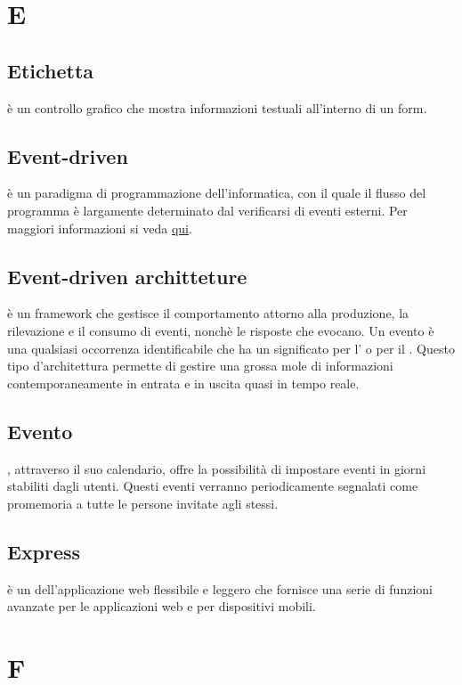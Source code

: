 \documentclass[12pt,a4paper]{article}
\begin{document}
\newpage

\section{E}


\subsection{Etichetta} 
 è un controllo grafico che mostra informazioni testuali all'interno di un form.

\subsection{Event-driven} 
 è un paradigma di programmazione dell'informatica, con il quale il flusso del programma è largamente determinato dal verificarsi di eventi esterni. Per maggiori informazioni si veda \href{https://it.wikipedia.org/wiki/Programmazione_a_eventi}{qui}.

\subsection{Event-driven architteture} 
è un framework che gestisce il comportamento attorno alla produzione, la rilevazione e il consumo di eventi, nonchè le risposte che evocano. Un evento è una qualsiasi occorrenza identificabile che ha un significato per l' o per il . Questo tipo d'architettura  permette di gestire  una grossa mole di informazioni contemporaneamente  in entrata e in uscita quasi in tempo reale.

\subsection{Evento} 
 , attraverso il suo calendario, offre la possibilità di impostare eventi in giorni stabiliti dagli utenti. Questi eventi verranno periodicamente segnalati come promemoria a tutte le persone invitate agli stessi.

\subsection{Express} 
è un  dell'applicazione web  flessibile e leggero che fornisce una serie di funzioni avanzate per le applicazioni web e per dispositivi mobili.


\newpage

\section{F}
\end{document}
